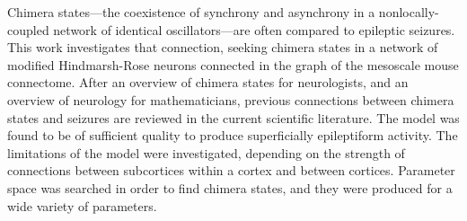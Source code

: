 Chimera states---the coexistence of synchrony and asynchrony in a nonlocally-coupled network of identical oscillators---are often compared to epileptic seizures.
This work investigates that connection, seeking chimera states in a network of modified Hindmarsh-Rose neurons connected in the graph of the mesoscale mouse connectome.
After an overview of chimera states for neurologists,
and an overview of neurology for mathematicians,
previous connections between chimera states and seizures are reviewed in the current scientific literature.
The model was found to be of sufficient quality to produce superficially epileptiform activity.
The limitations of the model were investigated, depending on the strength of connections between subcortices within a cortex and between cortices.
Parameter space was searched in order to find chimera states, and they were produced for a wide variety of parameters.

